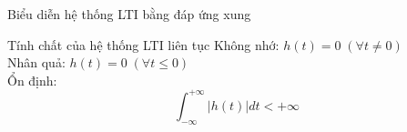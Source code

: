 \documentclass[8pt]{beamer}
\begin{document}
\begin{frame}{Biểu diễn hệ thống LTI bằng đáp ứng xung}
	\begin{block}{Tính chất của hệ thống LTI liên tục}
		Không nhớ: $h(t)=0\;(\forall t\neq 0)$\\

		Nhân quả: $h(t)=0\;(\forall t\leq 0)$\\

		Ổn định:
$$\int_{-\infty}^{+\infty}|h(t)|dt<+\infty$$
	\end{block}
\end{frame}
\end{document}
